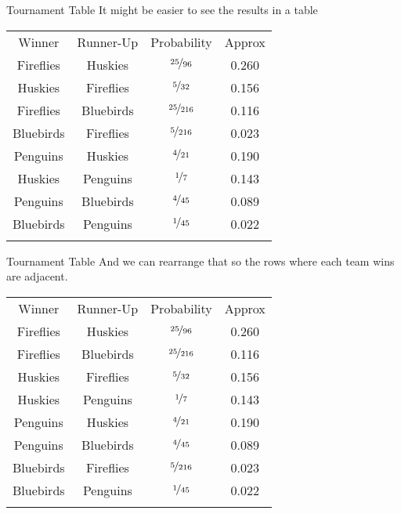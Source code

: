\documentclass[
  ignorenonframetext,
]{beamer}
\renewcommand{\,}{\text{, }}
\begin{document}
\begin{frame}{Tournament Table}
\protect\hypertarget{tournament-table}{}
It might be easier to see the results in a table

\begin{longtable}[]{@{}cccc@{}}
\toprule
Winner & Runner-Up & Probability & Approx \\ \addlinespace
\midrule
\endhead
Fireflies & Huskies & \(\nicefrac{25}{96}\) & 0.260 \\ \addlinespace
Huskies & Fireflies & \(\nicefrac{5}{32}\) & 0.156 \\ \addlinespace
Fireflies & Bluebirds & \(\nicefrac{25}{216}\) & 0.116 \\ \addlinespace
Bluebirds & Fireflies & \(\nicefrac{5}{216}\) & 0.023 \\ \addlinespace
Penguins & Huskies & \(\nicefrac{4}{21}\) & 0.190 \\ \addlinespace
Huskies & Penguins & \(\nicefrac{1}{7}\) & 0.143 \\ \addlinespace
Penguins & Bluebirds & \(\nicefrac{4}{45}\) & 0.089 \\ \addlinespace
Bluebirds & Penguins & \(\nicefrac{1}{45}\) & 0.022 \\ \addlinespace
\bottomrule
\end{longtable}
\end{frame}

\begin{frame}{Tournament Table}
\protect\hypertarget{tournament-table-1}{}
And we can rearrange that so the rows where each team wins are adjacent.

\begin{longtable}[]{@{}cccc@{}}
\toprule
Winner & Runner-Up & Probability & Approx \\ \addlinespace
\midrule
\endhead
Fireflies & Huskies & \(\nicefrac{25}{96}\) & 0.260 \\ \addlinespace
Fireflies & Bluebirds & \(\nicefrac{25}{216}\) & 0.116 \\ \addlinespace
Huskies & Fireflies & \(\nicefrac{5}{32}\) & 0.156 \\ \addlinespace
Huskies & Penguins & \(\nicefrac{1}{7}\) & 0.143 \\ \addlinespace
Penguins & Huskies & \(\nicefrac{4}{21}\) & 0.190 \\ \addlinespace
Penguins & Bluebirds & \(\nicefrac{4}{45}\) & 0.089 \\ \addlinespace
Bluebirds & Fireflies & \(\nicefrac{5}{216}\) & 0.023 \\ \addlinespace
Bluebirds & Penguins & \(\nicefrac{1}{45}\) & 0.022 \\ \addlinespace
\bottomrule
\end{longtable}
\end{frame}
\end{document}
